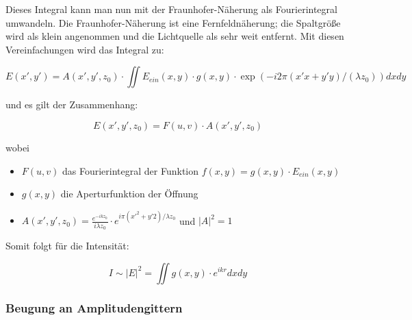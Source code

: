 Dieses Integral kann man nun mit der Fraunhofer-N\"aherung als Fourierintegral umwandeln. Die Fraunhofer-N\"aherung ist eine Fernfeldn\"aherung; die Spaltgr\"o\ss e wird als klein angenommen und die Lichtquelle als sehr weit entfernt. Mit diesen Vereinfachungen wird das Integral zu:

$$ E(x',y') = A(x',y',z_0)\cdot \iint E_{ein}(x,y)\cdot g(x,y)\cdot \exp(-i2\pi(x'x+y'y)/(\lambda z_0)) dxdy $$

und es gilt der Zusammenhang:

$$ E(x',y',z_0) = F(u,v) \cdot A(x',y',z_0)$$

wobei \begin{itemize}
\item $F(u,v)$ das Fourierintegral der Funktion $f(x,y) = g(x,y)\cdot E_{ein}(x,y)$
\item $g(x,y)$ die Aperturfunktion der \"Offnung
\item $A(x',y',z_0)=\frac{e^{-ikz_0}}{i\lambda z_0}\cdot e^{i\pi (x'^2 + y'2) / \lambda z_0}$ und $|A|^2 =1$
\end{itemize}

Somit folgt f\"ur die Intensit\"at:

$$I \sim |E|^2 = \iint g(x,y)\cdot e^{ikr} dxdy$$


\subsubsection{Beugung an Amplitudengittern}

